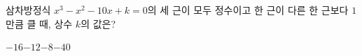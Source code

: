 삼차방정식 $x^3-x^2-10x+k=0$의 세 근이 모두 정수이고 한 근이 다른 한 근보다 $1$만큼 클 때, 상수 $k$의 값은?
\begin{choices32}{$-16$}{$-12$}{$-8$}{$-4$}{$0$}\end{choices32}
